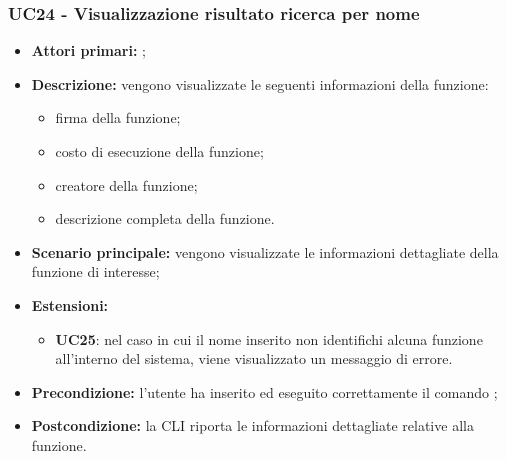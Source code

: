 \subsubsection{UC24 - Visualizzazione risultato ricerca per nome}
\begin{itemize}
	\item \textbf{Attori primari:} \ua{};
	\item \textbf{Descrizione:} vengono visualizzate le seguenti informazioni della funzione:
	\begin{itemize}
		\item firma della funzione;
		\item costo di esecuzione della funzione; 
		\item creatore della funzione; 
		\item descrizione completa della funzione.
	\end{itemize} 
	\item \textbf{Scenario principale:} vengono visualizzate le informazioni  dettagliate della funzione di interesse;
	\item \textbf{Estensioni: }
	\begin{itemize}
		\item \textbf{UC25}: nel caso in cui il nome inserito non identifichi alcuna funzione all'interno del sistema, viene visualizzato un messaggio di errore.
	\end{itemize}
	\item \textbf{Precondizione:} l’utente ha inserito ed eseguito correttamente il comando \pinfo{}; 
	\item \textbf{Postcondizione:} la CLI riporta le informazioni dettagliate relative alla funzione. 
\end{itemize}
